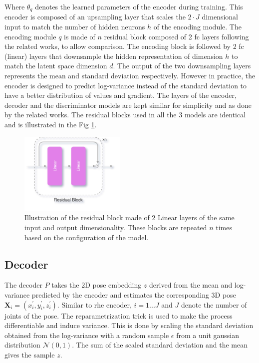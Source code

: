 Where $\theta_q$ denotes the learned parameters of the encoder during training. This encoder is composed of an upsampling layer that scales the $2\!\cdot\!J$ dimensional input to match the number of hidden neurons $h$ of the encoding module. The encoding module $q$ is made of $n$ residual block composed of 2 \ac{fc} layers following the related works, to allow comparison. The encoding block is followed by 2 \ac{fc} (linear) layers that downsample the hidden representation of dimension $h$ to match the latent space dimension $d$. The output of the two downsampling layers represents the mean and standard deviation respectively. However in practice, the encoder is designed to predict log-variance instead of the standard deviation to have a better distribution of values and gradient. The layers of the encoder, decoder and the discriminator models are kept similar for simplicity and as done by the related works. The residual blocks used in all the 3 models are identical and is illustrated in the Fig \ref{fig:residual_block}.

\begin{figure}[h] \label{fig:residual_block}
    \centering
    \includegraphics[width=0.45\textwidth]{figures/arch/res_block.png}
    \caption{Illustration of the residual block made of 2 Linear layers of the same input and output dimensionality. These blocks are repeated $n$ times based on the configuration of the model.
    }
\end{figure}

\subsection{Decoder}
The decoder $P$ takes the 2D pose embedding $z$ derived from the mean and log-variance predicted by the encoder and estimates the corresponding 3D pose $\textbf{X}_i = (x^\prime_i, y^\prime_i, z^\prime_i)$. Similar to rhe encoder, $i = 1 ... J$ and $J$ denote the number of joints of the pose. The reparametrization trick is used to make the process differentiable and induce variance. This is done by scaling the standard deviation obtained from the log-variance with a random sample $\epsilon$ from a unit gaussian distribution $\mathcal{N}(0,1)$. The sum of the scaled standard deviation and the mean gives the sample $z$.

